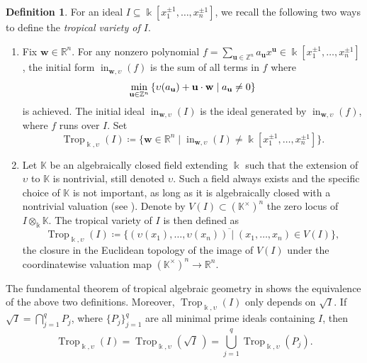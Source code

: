 \documentclass[11pt]{amsart}
\theoremstyle{definition}
\newtheorem{definition}[theorem]{Definition}
\newcommand{\Z}{\mathbb{Z}}
\newcommand{\R}{\mathbb{R}}
\newcommand{\K}{\mathbb{K}}
\renewcommand{\k}{\Bbbk}
\DeclareMathOperator{\init}{in}
\DeclareMathOperator{\Trop}{Trop}
\begin{document}
\begin{definition}
\label{def:tropical-variety}
For an ideal $I\subseteq \k[x_1^{{\pm 1} },\ldots,x_n^{{\pm 1} }]$, 
we recall the following two  ways to define the \textit{tropical variety of $I$}. 

\begin{enumerate} 
\item \label{trop1} Fix $\mathbf{w}\in \R^n$. For any nonzero polynomial 
$f=\sum\limits_{\textbf{u}\in\Z^n}a_{\textbf{u}} 
x^{\textbf{u}}\in \k[x_1^{{\pm 1} },\ldots,x_n^{{\pm 1} }]$,  the initial form 
$\init_{\textbf{w},\upsilon}(f)$ is the sum of all terms in $f$ 
where
\[
\min\limits_{{\textbf{u}}\in \Z^n} 
\left\{ \upsilon(a_{{\bf{u}}})+{\bf{u}}\cdot{\textbf{w}} \mid a_{\textbf{u}}\neq 0\right\}
\]
is achieved. The initial 
ideal $\init_{\textbf{w},\upsilon}(I)$ is the ideal generated by 
$\init_{\textbf{w},\upsilon}(f)$, where $f$ runs over $I$. Set 
\begin{equation*}
\label{def:trop-ideal}
\Trop_{\k, \upsilon}(I)\coloneqq \{\textbf{w}\in \R^n\mid 
\init_{\textbf{w},\upsilon}(I) \neq \k[x_1^{{\pm 1}},\ldots,x_n^{{\pm 1}}]\}.
\end{equation*}

\item \label{trop2} Let $\K$ be an algebraically closed field extending $\k$ 
such that the extension of $\upsilon$ to $\K$ is nontrivial, still denoted 
$\upsilon$. Such a field always exists and the specific choice of $\K$ is 
not important, as long as it is algebraically closed with a nontrivial 
valuation (see \cite[Thm.~3.2.4 and Rem.~3.2.5]{MacStu}). 
Denote by $V(I)\subset (\K^{\times})^n$ the zero locus of $I\otimes_{\k}\K$.
The tropical variety of $I$ is then defined as
\[
\Trop_{\k,\upsilon}(I) \coloneqq 
\overline{\{(\upsilon(x_1),\ldots,\upsilon(x_n))\mid 
(x_1,\ldots,x_n)\in V(I)\}},
\]
the closure in the Euclidean topology of the image of $V(I)$ 
under the coordinatewise valuation map $(\K^{\times})^n \to \R^n$.
\end{enumerate}
\end{definition}

The  fundamental theorem of tropical algebraic geometry in 
\cite[Thm.~3.2.3]{MacStu} shows the equivalence of the above two definitions.
Moreover, $\Trop_{\k,\upsilon}(I)$ only depends on $\sqrt{I}$. 
If $\sqrt{I}=\bigcap\limits_{j=1}^q P_j$, where $\{P_j\}_{j=1}^q$ 
are all minimal prime ideals containing $I$, then
\[
\Trop_{\k,\upsilon}(I)=\Trop_{\k,\upsilon}\left(\!\sqrt{I}\,\right)=
\bigcup_{j=1}^q \Trop_{\k,\upsilon}(P_j).
\]
\end{document}
